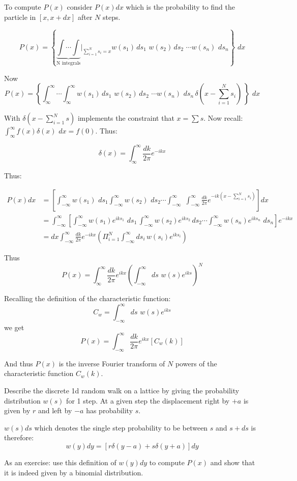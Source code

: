 To compute $P(x)$ consider $P(x) dx$ which is the probability to find the particle in $[x, x+dx]$ after $N$ steps.

$$P(x) = \left\{ \underbrace{\int \cdots \int}_{\text{N integrals}} \bigg|_{\sum_{i=1}^N s_i = x} w(s_1) \, ds_1 \, \, w(s_2) \, ds_2 \, \, \cdots w(s_n) \, \, ds_n \right\} \, \, dx$$

Now $$P(x) = \left\{ \int_{\infty}^{\infty} \cdots \int_{\infty}^{\infty} w(s_1) \, ds_1 \, \, w(s_2) \, ds_2 \, \, \cdots w(s_n) \, \, ds_n \, \delta(x - \sum_{i=1}^N s_i) \, \right\} \, \, dx$$

With $\delta(x - \sum_{i=1}^N s)$ implements the constraint that $x = \sum s$. Now recall: $\int_{\infty}^{\infty}  f(x) \delta(x) \, \, dx = f(0)$. Thus:

\begin{equation*}
\delta(x) = \int_{\infty}^{\infty} \frac{dk}{2 \pi} e^{-ikx}
\end{equation*}

Thus:

\begin{align*}
P(x) dx &= \left[ \int_{-\infty}^{\infty} w(s_1) \, \, ds_1 \int_{-\infty}^{\infty} w(s_2) \,\, ds_2 \cdots \int_{-\infty}^{\infty} \, \, \int_{-\infty}^{\infty} \frac{dk}{2\pi} e^{-ik (x - \sum_{i=1}^N s_i)}\right] dx \\
&= \int_{-\infty}^{\infty} \left [ \int_{-\infty}^{\infty} w(s_1) e^{iks_1} \, \, ds_1 \, \int_{-\infty}^{\infty} w(s_2) e^{iks_2} \, ds_2 \cdots \int_{-\infty}^{\infty} w(s_n) e^{iks_n} \, \, ds_n\right] e^{-ikx} \\
&= dx \int_{-\infty}^{\infty} \frac{dk}{2\pi} e^{-ikx} \left(\Pi_{i=1}^N \int_{-\infty}^{\infty} ds_i \, w(s_i) e^{iks_i}\right)
\end{align*}

Thus $$P(x) = \int_{\infty}^{\infty} \frac{dk}{2\pi} e^{ikx} \left(\int_{-\infty}^{\infty} ds \, \, w(s) e^{iks}\right)^N$$

Recalling the definition of the characteristic function: $$C_{w} = \int_{-\infty}^{\infty} ds \, \, w(s) e^{iks}$$ we get
$$P(x) = \int_{-\infty}^{\infty} \frac{dk}{2\pi} e^{ikx} \left[C_w(k)\right]$$

And thus $P(x)$ is the inverse Fourier transform of $N$ powers of the characteristic function $C_w(k)$.

Describe the discrete 1d random walk on a lattice by giving the probability distribution $w(s)$ for 1 step. At a given step the displacement right by $+a$ is given by $r$ and left by $-a$ has probability $s$.

$w(s) ds$ which denotes the single step probability to be between $s$ and $s+ds$ is therefore: $$w(y) dy = \left[r \delta(y-a) + s \delta(y+a)\right] dy$$

As an exercise: use this definition of $w(y) dy$ to compute $P(x)$ and show that it is indeed given by a binomial distribution.